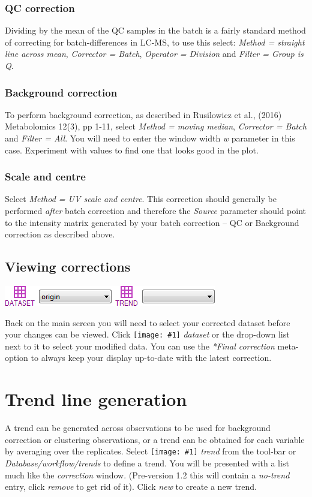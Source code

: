 \documentclass[11pt,a4paper]{article}
\newcommand{\menu}[1]{ \flqq\textit{#1}\frqq}
\newcommand{\icon}[1]{\texttt{[image: \#1]}}
\begin{document}
\subsubsection{QC correction}
Dividing by the mean of the QC samples in the batch is a fairly standard method of correcting for batch-differences in LC-MS, to use this select: \menu{Method = straight line across mean}, \menu{Corrector = Batch}, \menu{Operator = Division} and \menu{Filter = Group is Q}. 

\subsubsection{Background correction}
To perform background correction, as described in Rusilowicz et al., (2016) Metabolomics 12(3), pp 1-11, select \menu{Method = moving median}, \menu{Corrector = Batch} and \menu{Filter = All}. You will need to enter the window width \menu{w} parameter in this case. Experiment with values to find one that looks good in the plot.

\subsubsection{Scale and centre}
Select \menu{Method = UV scale and centre}. This correction should generally be performed \textit{after} batch correction and therefore the \menu{Source} parameter should point to the intensity matrix generated by your batch correction -- QC or Background correction as described above.

\subsection{Viewing corrections}
\begin{center}
	\includegraphics[max width=0.7\linewidth]{Images/userguide/dataset}
\end{center}
Back on the main screen you will need to select your corrected dataset before your changes can be viewed. Click \icon{dataset button} \menu{dataset} or the drop-down list next to it to select your modified data. You can use the \menu{*Final correction} meta-option to always keep your display up-to-date with the latest correction.

\section{Trend line generation}
A trend can be generated across observations to be used for background correction or clustering observations, or a trend can be obtained for each variable by averaging over the replicates. Select \icon{trend} \menu{trend} from the tool-bar or \menu{Database/workflow/trends} to define a trend.
You will be presented with a list much like the \menu{correction} window. (Pre-version 1.2 this will contain a \menu{no-trend} entry, click \menu{remove} to get rid of it). Click \menu{new} to create a new trend.
\end{document}

